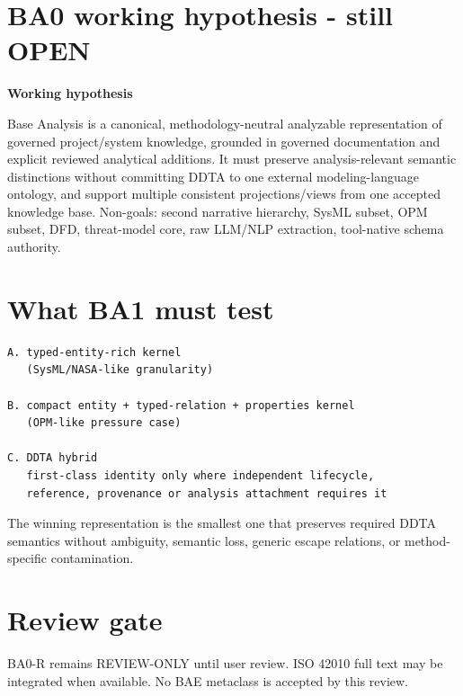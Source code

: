 \documentclass[10pt,a4paper]{article}
\newenvironment{gate}[1]{\def\FrameCommand{\fcolorbox{ddtagreen}{ddtagray}}\MakeFramed{\advance\hsize-2\width\FrameRestore}\noindent\textbf{#1}\par\smallskip}{\endMakeFramed}
\begin{document}
\section{BA0 working hypothesis - still OPEN}
\begin{gate}{Working hypothesis}
Base Analysis is a canonical, methodology-neutral analyzable representation of governed project/system knowledge, grounded in governed documentation and explicit reviewed analytical additions. It must preserve analysis-relevant semantic distinctions without committing DDTA to one external modeling-language ontology, and support multiple consistent projections/views from one accepted knowledge base.
\end{gate}
Non-goals: second narrative hierarchy, SysML subset, OPM subset, DFD, threat-model core, raw LLM/NLP extraction, tool-native schema authority.
\section{What BA1 must test}
\begin{lstlisting}
A. typed-entity-rich kernel
   (SysML/NASA-like granularity)

B. compact entity + typed-relation + properties kernel
   (OPM-like pressure case)

C. DDTA hybrid
   first-class identity only where independent lifecycle,
   reference, provenance or analysis attachment requires it
\end{lstlisting}
The winning representation is the smallest one that preserves required DDTA semantics without ambiguity, semantic loss, generic escape relations, or method-specific contamination.
\section{Review gate}
BA0-R remains REVIEW-ONLY until user review. ISO 42010 full text may be integrated when available. No BAE metaclass is accepted by this review.
\end{document}

